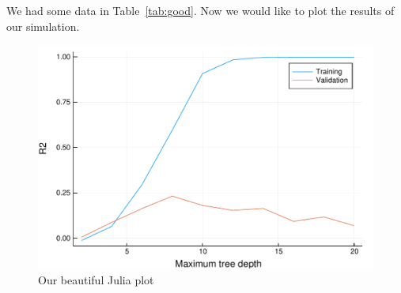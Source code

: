 
We had some data in Table~\ref{tab:good}. Now we would like to plot the results of our simulation.

\begin{figure}[h]
\centering
\includegraphics[width=\columnwidth]{../plot.pdf}
\caption{Our beautiful Julia plot}
\label{fig:plot}
\end{figure}

